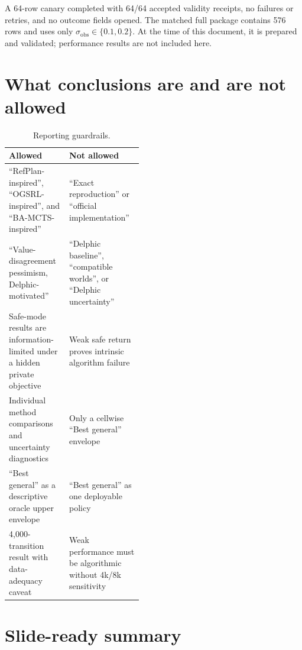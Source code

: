 \documentclass[11pt,a4paper]{article}
\begin{document}
A 64-row canary completed with 64/64 accepted validity receipts, no failures or retries, and no
outcome fields opened. The matched full package contains 576 rows and uses only
$\sigma_{\mathrm{obs}}\in\{0.1,0.2\}$. At the time of this document, it is prepared and validated;
performance results are not included here.

\section{What conclusions are and are not allowed}

\begin{table}[ht]
\centering
\caption{Reporting guardrails.}
\begin{tabularx}{\linewidth}{P{0.45\linewidth}Y}
\toprule
Allowed & Not allowed \\
\midrule
``RefPlan-inspired'', ``OGSRL-inspired'', and ``BA-MCTS-inspired'' & ``Exact reproduction'' or ``official implementation'' \\
``Value-disagreement pessimism, Delphic-motivated'' & ``Delphic baseline'', ``compatible worlds'', or ``Delphic uncertainty'' \\
Safe-mode results are information-limited under a hidden private objective & Weak safe return proves intrinsic algorithm failure \\
Individual method comparisons and uncertainty diagnostics & Only a cellwise ``Best general'' envelope \\
``Best general'' as a descriptive oracle upper envelope & ``Best general'' as one deployable policy \\
4,000-transition result with data-adequacy caveat & Weak performance must be algorithmic without 4k/8k sensitivity \\
\bottomrule
\end{tabularx}
\end{table}

\section{Slide-ready summary}
\end{document}
